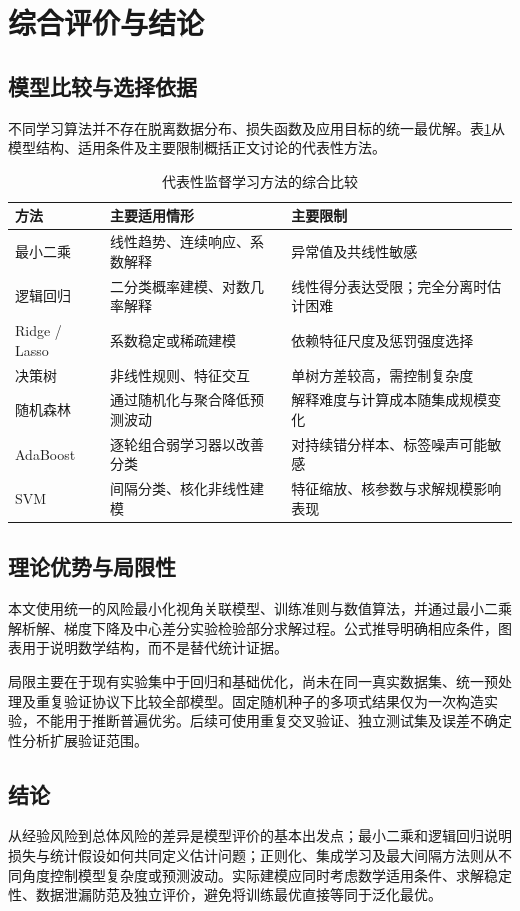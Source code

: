 \section{综合评价与结论}\label{ch:conclusion}

\subsection{模型比较与选择依据}
不同学习算法并不存在脱离数据分布、损失函数及应用目标的统一最优解。表\ref{tab:model-selection}从模型结构、适用条件及主要限制概括正文讨论的代表性方法。

\begin{table}[htbp]\centering
\caption{代表性监督学习方法的综合比较}\label{tab:model-selection}
\begin{tabularx}{\textwidth}{p{25mm}XX}\toprule
方法 & 主要适用情形 & 主要限制\\\midrule
最小二乘 & 线性趋势、连续响应、系数解释 & 异常值及共线性敏感\\
逻辑回归 & 二分类概率建模、对数几率解释 & 线性得分表达受限；完全分离时估计困难\\
Ridge / Lasso & 系数稳定或稀疏建模 & 依赖特征尺度及惩罚强度选择\\
决策树 & 非线性规则、特征交互 & 单树方差较高，需控制复杂度\\
随机森林 & 通过随机化与聚合降低预测波动 & 解释难度与计算成本随集成规模变化\\
AdaBoost & 逐轮组合弱学习器以改善分类 & 对持续错分样本、标签噪声可能敏感\\
SVM & 间隔分类、核化非线性建模 & 特征缩放、核参数与求解规模影响表现\\\bottomrule
\end{tabularx}
\end{table}

\subsection{理论优势与局限性}
本文使用统一的风险最小化视角关联模型、训练准则与数值算法，并通过最小二乘解析解、梯度下降及中心差分实验检验部分求解过程。公式推导明确相应条件，图表用于说明数学结构，而不是替代统计证据。

局限主要在于现有实验集中于回归和基础优化，尚未在同一真实数据集、统一预处理及重复验证协议下比较全部模型。固定随机种子的多项式结果仅为一次构造实验，不能用于推断普遍优劣。后续可使用重复交叉验证、独立测试集及误差不确定性分析扩展验证范围。

\subsection{结论}
从经验风险到总体风险的差异是模型评价的基本出发点；最小二乘和逻辑回归说明损失与统计假设如何共同定义估计问题；正则化、集成学习及最大间隔方法则从不同角度控制模型复杂度或预测波动。实际建模应同时考虑数学适用条件、求解稳定性、数据泄漏防范及独立评价，避免将训练最优直接等同于泛化最优。

